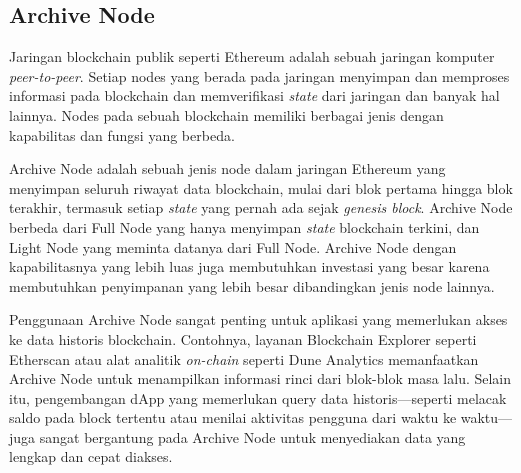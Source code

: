 \subsection{Archive Node}
\label{subsec:archive-node}

Jaringan blockchain publik seperti Ethereum adalah sebuah jaringan komputer \textit{peer-to-peer}. Setiap nodes yang berada pada jaringan menyimpan dan memproses informasi pada blockchain dan memverifikasi \textit{state} dari jaringan dan banyak hal lainnya. Nodes pada sebuah blockchain memiliki berbagai jenis dengan kapabilitas dan fungsi yang berbeda.

Archive Node adalah sebuah jenis node dalam jaringan Ethereum yang menyimpan seluruh riwayat data blockchain, mulai dari blok pertama hingga blok terakhir, termasuk setiap \textit{state} yang pernah ada sejak \textit{genesis block}. Archive Node berbeda dari Full Node yang hanya menyimpan \textit{state} blockchain terkini, dan Light Node yang meminta datanya dari Full Node. Archive Node dengan kapabilitasnya yang lebih luas juga membutuhkan investasi yang besar karena membutuhkan penyimpanan yang lebih besar dibandingkan jenis node lainnya.

Penggunaan Archive Node sangat penting untuk aplikasi yang memerlukan akses ke data historis blockchain. Contohnya, layanan Blockchain Explorer seperti Etherscan atau alat analitik \textit{on-chain} seperti Dune Analytics memanfaatkan Archive Node untuk menampilkan informasi rinci dari blok-blok masa lalu. Selain itu, pengembangan dApp yang memerlukan query data historis—seperti melacak saldo pada block tertentu atau menilai aktivitas pengguna dari waktu ke waktu—juga sangat bergantung pada Archive Node untuk menyediakan data yang lengkap dan cepat diakses.
